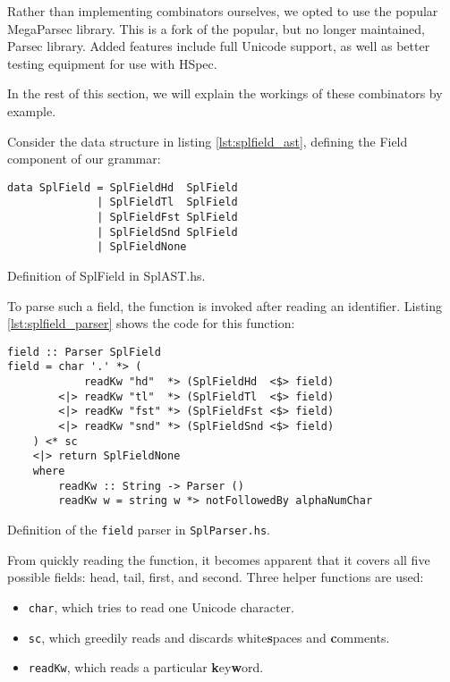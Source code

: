 Rather than implementing combinators ourselves, we opted to use the popular MegaParsec library.
This is a fork of the popular, but no longer maintained, Parsec library.
Added features include full Unicode support, as well as better testing equipment for use with HSpec.

In the rest of this section, we will explain the workings of these combinators by example.

Consider the data structure in listing \ref{lst:splfield_ast}, defining the \textsf{Field} component of our grammar:

\begin{listing}
\begin{verbatim}
data SplField = SplFieldHd  SplField
              | SplFieldTl  SplField
              | SplFieldFst SplField
              | SplFieldSnd SplField
              | SplFieldNone
\end{verbatim}
\caption{Definition of SplField in SplAST.hs.}
\label{lst:splfield_ast}
\end{listing}

To parse such a field, the  function is invoked after reading an identifier.
Listing \ref{lst:splfield_parser} shows the code for this function:

\begin{listing}
\begin{verbatim}
field :: Parser SplField
field = char '.' *> (
            readKw "hd"  *> (SplFieldHd  <$> field)
        <|> readKw "tl"  *> (SplFieldTl  <$> field)
        <|> readKw "fst" *> (SplFieldFst <$> field)
        <|> readKw "snd" *> (SplFieldSnd <$> field)
    ) <* sc
    <|> return SplFieldNone
    where
        readKw :: String -> Parser ()
        readKw w = string w *> notFollowedBy alphaNumChar
\end{verbatim}
\caption{Definition of the \texttt{field} parser in \texttt{SplParser.hs}.}
\label{lst:splfield_parser}
\end{listing}

From quickly reading the function, it becomes apparent that it covers all five possible fields: head, tail, first, and second.
Three helper functions are used:
\begin{itemize}
	\setlength{\itemsep}{0pt}
	\item \texttt{char}, which tries to read one Unicode character.
	\item \texttt{sc}, which greedily reads and discards white\textbf{s}paces and \textbf{c}omments.
	\item \texttt{readKw}, which reads a particular \textbf{k}ey\textbf{w}ord.
\end{itemize}

